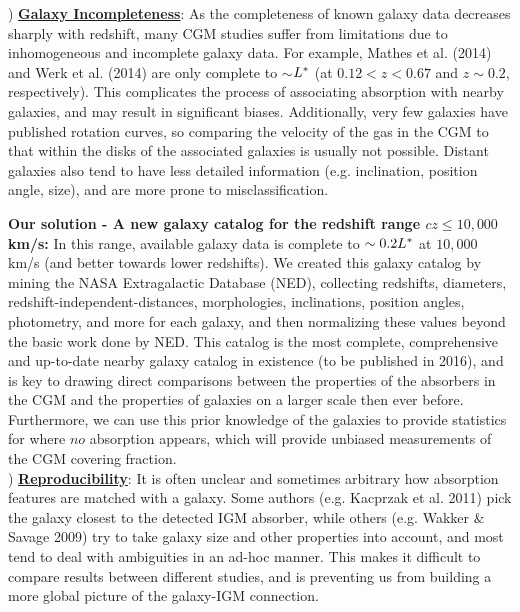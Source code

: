 \documentclass[12pt]{article}
\begin{document}
) \textbf{\underline{Galaxy Incompleteness}}: As the completeness of known galaxy data decreases sharply with redshift, many CGM studies suffer from limitations due to inhomogeneous and incomplete galaxy data. For example, Mathes et al. (2014) and Werk et al. (2014) are only complete to $\sim$$L^{\**}$ (at $0.12<z<0.67$ and $z\sim$$0.2$, respectively). This complicates the process of associating absorption with nearby galaxies, and may result in significant biases. Additionally, very few galaxies have published rotation curves, so comparing the velocity of the gas in the CGM to that within the disks of the associated galaxies is usually not possible. Distant galaxies also tend to have less detailed information (e.g. inclination, position angle, size), and are more prone to misclassification.

\textbf{Our solution - A new galaxy catalog for the redshift range $cz \leq 10,000$ km/s:} In this range, available galaxy data is complete to $\sim0.2 L^{\**}$ at $10,000$ km/s (and better towards lower redshifts). We created this galaxy catalog by mining the NASA Extragalactic Database (NED), collecting redshifts, diameters, redshift-independent-distances, morphologies, inclinations, position angles, photometry, and more for each galaxy, and then normalizing these values beyond the basic work done by NED. This catalog is the most complete, comprehensive and up-to-date nearby galaxy catalog in existence (to be published in 2016), and is key to drawing direct comparisons between the properties of the absorbers in the CGM and the properties of galaxies on a larger scale then ever before. Furthermore, we can use this prior knowledge of the galaxies to provide statistics for where $no$ absorption appears, which will provide unbiased measurements of the CGM covering fraction.\\


) \textbf{\underline{Reproducibility}}: It is often unclear and sometimes arbitrary how absorption features are matched with a galaxy. Some authors (e.g. Kacprzak et al. 2011) pick the galaxy closest to the detected IGM absorber, while others (e.g. Wakker $\&$ Savage 2009) try to take galaxy size and other properties into account, and most tend to deal with ambiguities in an ad-hoc manner. This makes it difficult to compare results between different studies, and is preventing us from building a more global picture of the galaxy-IGM connection.
\end{document}

